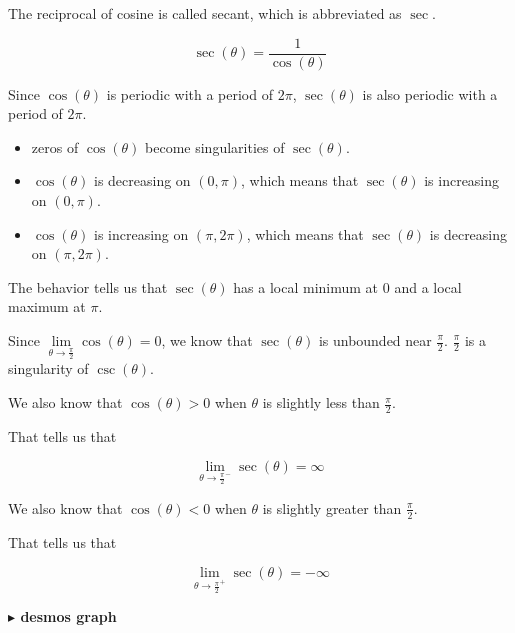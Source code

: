 \documentclass{ximera}
\begin{document}
The reciprocal of cosine is called secant, which is abbreviated as $\sec$.


\[
\sec(\theta) = \frac{1}{\cos(\theta)}
\]


Since $\cos(\theta)$ is periodic with a period of $2 \pi$, $\sec(\theta)$ is also periodic with a period of $2 \pi$.



\begin{itemize}
\item zeros of $\cos(\theta)$ become singularities of $\sec(\theta)$.
\end{itemize}




\begin{itemize}
\item $\cos(\theta)$ is decreasing on $(0, \pi)$, which means that $\sec(\theta)$ is increasing on $(0, \pi)$.
\item $\cos(\theta)$ is increasing on $(\pi, 2 \pi)$, which means that $\sec(\theta)$ is decreasing on $(\pi, 2 \pi)$.
\end{itemize}



The behavior tells us that $\sec(\theta)$ has a local minimum at $0$ and a local maximum at $\pi$.





Since $\lim\limits_{\theta \to \tfrac{\pi}{2}} \cos(\theta) = 0$, we know that $\sec(\theta)$ is unbounded near $\frac{\pi}{2}$.  $\frac{\pi}{2}$ is a singularity of $\csc(\theta)$.

We also know that $\cos(\theta) > 0$ when $\theta$ is slightly less than $\frac{\pi}{2}$.

That tells us that

\[
\lim\limits_{\theta \to \frac{\pi}{2}^-} \sec(\theta) = \infty
\]



We also know that $\cos(\theta) < 0$ when $\theta$ is slightly greater than $\frac{\pi}{2}$.

That tells us that

\[
\lim\limits_{\theta \to \frac{\pi}{2}^+} \sec(\theta) = -\infty
\]












\textbf{\textcolor{blue!55!black}{$\blacktriangleright$ desmos graph}} 
\begin{center}
\end{center}
\end{document}
